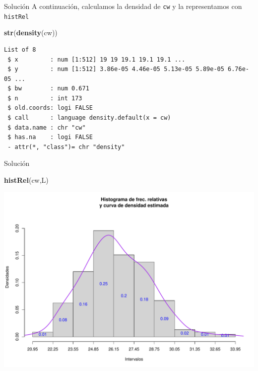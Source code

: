 \documentclass[
  ignorenonframetext,
]{beamer}
\newenvironment{Shaded}{\begin{snugshade}}{\end{snugshade}}
\newcommand{\FunctionTok}[1]{\textcolor[rgb]{0.13,0.29,0.53}{\textbf{#1}}}
\newcommand{\NormalTok}[1]{#1}
\begin{document}
\begin{frame}[fragile]{Solución}
\label{soluciuxf3n-43}
A continuación, calculamos la densidad de \texttt{cw} y la representamos
con \texttt{histRel}

\begin{Shaded}
\begin{Highlighting}[]
\FunctionTok{str}\NormalTok{(}\FunctionTok{density}\NormalTok{(cw))}
\end{Highlighting}
\end{Shaded}

\begin{verbatim}
List of 8
 $ x         : num [1:512] 19 19 19.1 19.1 19.1 ...
 $ y         : num [1:512] 3.86e-05 4.46e-05 5.13e-05 5.89e-05 6.76e-05 ...
 $ bw        : num 0.671
 $ n         : int 173
 $ old.coords: logi FALSE
 $ call      : language density.default(x = cw)
 $ data.name : chr "cw"
 $ has.na    : logi FALSE
 - attr(*, "class")= chr "density"
\end{verbatim}
\end{frame}

\begin{frame}[fragile]{Solución}
\label{soluciuxf3n-44}
\begin{Shaded}
\begin{Highlighting}[]
\FunctionTok{histRel}\NormalTok{(cw,L)}
\end{Highlighting}
\end{Shaded}

\includegraphics{R_base_files/figure-beamer/unnamed-chunk-251-1.pdf}
\end{frame}
\end{document}
